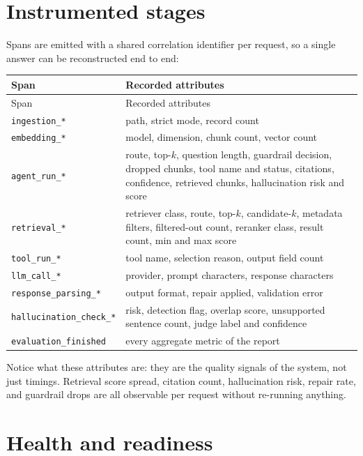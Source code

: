 \section{Instrumented stages}

Spans are emitted with a shared correlation identifier per request, so a single
answer can be reconstructed end to end:

\begin{longtable}{p{} p{}}
\toprule
Span & Recorded attributes \\
\midrule
\endfirsthead
\toprule
Span & Recorded attributes \\
\midrule
\endhead
\bottomrule
\endlastfoot
\texttt{ingestion\_*} & path, strict mode, record count \\
\texttt{embedding\_*} & model, dimension, chunk count, vector count \\
\texttt{agent\_run\_*} & route, top-$k$, question length, guardrail decision,
  dropped chunks, tool name and status, citations, confidence, retrieved
  chunks, hallucination risk and score \\
\texttt{retrieval\_*} & retriever class, route, top-$k$, candidate-$k$,
  metadata filters, filtered-out count, reranker class, result count,
  min and max score \\
\texttt{tool\_run\_*} & tool name, selection reason, output field count \\
\texttt{llm\_call\_*} & provider, prompt characters, response characters \\
\texttt{response\_parsing\_*} & output format, repair applied, validation error \\
\texttt{hallucination\_check\_*} & risk, detection flag, overlap score,
  unsupported sentence count, judge label and confidence \\
\texttt{evaluation\_finished} & every aggregate metric of the report \\
\end{longtable}

Notice what these attributes are: they are the quality signals of the system,
not just timings. Retrieval score spread, citation count, hallucination risk,
repair rate, and guardrail drops are all observable per request without
re-running anything.

\section{Health and readiness}

